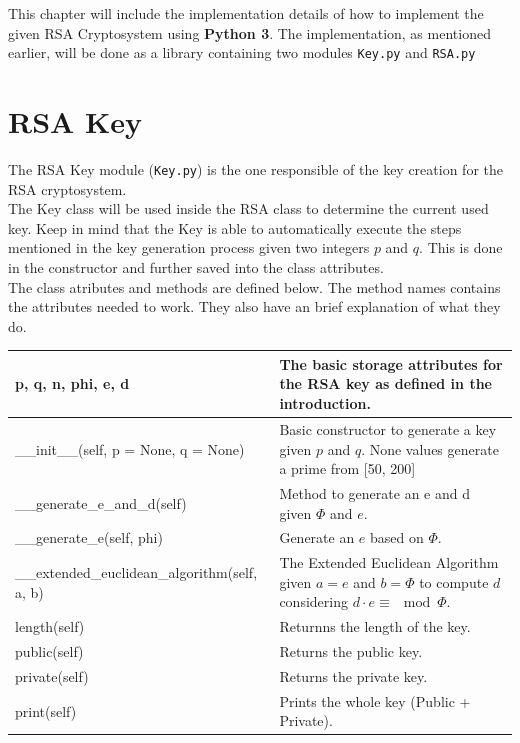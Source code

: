 \documentclass[usenames,dvipsnames,12pt]{report}
\begin{document}
This chapter will include the implementation details of how to implement the given RSA Cryptosystem
using \textbf{Python 3}. The implementation, as mentioned earlier, will be done as a library containing
two modules \texttt{Key.py} and \texttt{RSA.py}

\section{RSA Key}

The RSA Key module (\texttt{Key.py}) is the one responsible of the key creation for the RSA cryptosystem.\\

The Key class will be used inside the RSA class to determine the current used key. Keep in mind that
the Key is able to automatically execute the steps mentioned in the key generation process given
two integers $p$ and $q$. This is done in the constructor and further saved into the class attributes.\\

The class atributes and methods are defined below. The method names contains the attributes needed to work.
They also have an brief explanation of what they do.

\begin{center}
    \begin{tabular}{ | l | p{6cm} |}
    \hline
    p, q, n, phi, e, d & The basic storage attributes for the RSA key as defined in the introduction.\\ \hline
    \_\_init\_\_(self, p = None, q = None) & Basic constructor to generate a key given $p$ and $q$. None values generate a prime from [50, 200]\\ \hline
    \_\_generate\_e\_and\_d(self) & Method to generate an e and d given $\Phi$ and $e$.\\ \hline
    \_\_generate\_e(self, phi) & Generate an $e$ based on $\Phi$.\\ \hline
    \_\_extended\_euclidean\_algorithm(self, a, b) & The Extended Euclidean Algorithm given $a = e$ and $b = \Phi$ to compute $d$ considering $d \cdot e \equiv \mod \Phi$.\\ \hline
    length(self) & Returnns the length of the key.\\ \hline
    public(self) & Returns the public key.\\ \hline
    private(self) & Returns the private key.\\ \hline
    print(self) & Prints the whole key (Public + Private).\\
    \hline
    \end{tabular}
\end{center}
\end{document}
